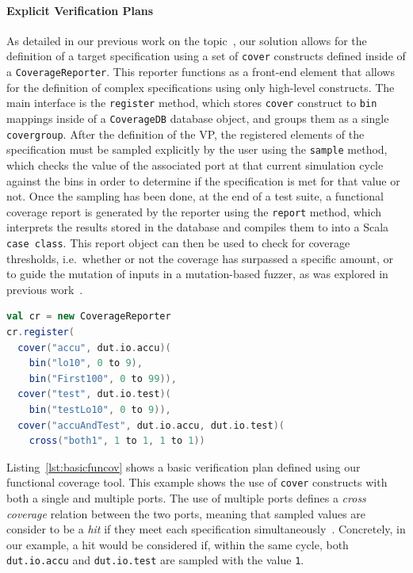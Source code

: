 \documentclass[conference]{IEEEtran}
\begin{document}
\paragraph{Explicit Verification Plans} As detailed in our previous work on the topic~\cite{dobisCoverage:ETS22}, our solution allows for the definition of a target specification using a set of \texttt{cover} constructs defined inside of a \texttt{CoverageReporter}.
This reporter functions as a front-end element that allows for the definition of complex specifications using only high-level constructs.
The main interface is the \texttt{register} method, which stores \texttt{cover} construct to \texttt{bin} mappings inside of a \texttt{CoverageDB} database object, and groups them as a single \texttt{covergroup}.
After the definition of the VP, the registered elements of the specification must be sampled explicitly by the user using the \texttt{sample} method, which checks the value of the associated port at that current simulation cycle against the bins in order to determine if the specification is met for that value or not.
Once the sampling has been done, at the end of a test suite, a functional coverage report is generated by the reporter using the \texttt{report} method, which interprets the results stored in the database and compiles them to into a Scala \texttt{case class}. 
This report object can then be used to check for coverage thresholds, i.e.\ whether or not the coverage has surpassed a specific amount, or to guide the mutation of inputs in a mutation-based fuzzer, as was explored in previous work~\cite{dobisFCFuzzing:WOSET2021}.

\begin{lstlisting}[captionpos=b,caption={Small Verification Plan defined using 3 \texttt{cover} constructs, including one cross coverage construct},label={lst:basicfuncov},language=scala]
val cr = new CoverageReporter
cr.register(
  cover("accu", dut.io.accu)(
    bin("lo10", 0 to 9),
    bin("First100", 0 to 99)),
  cover("test", dut.io.test)(
    bin("testLo10", 0 to 9)),
  cover("accuAndTest", dut.io.accu, dut.io.test)(
    cross("both1", 1 to 1, 1 to 1))
\end{lstlisting}

Listing~\ref{lst:basicfuncov} shows a basic verification plan defined using our functional coverage tool. 
This example shows the use of \texttt{cover} constructs with both a single and multiple ports. 
The use of multiple ports defines a \textit{cross coverage} relation between the two ports, meaning that sampled values are consider to be a \emph{hit} if they meet each specification simultaneously~\cite{spear2008systemverilog}.
Concretely, in our example, a hit would be considered if, within the same cycle, both \texttt{dut.io.accu} and \texttt{dut.io.test} are sampled with the value \texttt{1}. 
\end{document}
